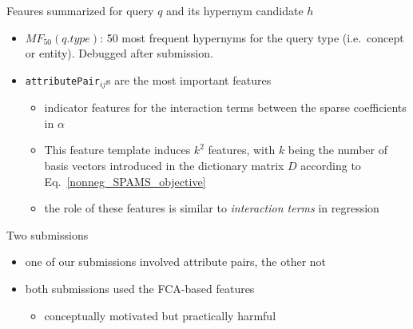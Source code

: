 \documentclass{beamer}
\newlength{\onecolwid}
\newcommand{\bull}[1]{
  \begin{itemize}
    \item #1
  \end{itemize}
}
\begin{document}
\begin{frame}[t]
\begin{columns}[t]
\begin{column}{\onecolwid}
\begin{block}{Feaures summarized}{ for query $q$ and its hypernym candidate $h$ }

\begin{itemize}
  \item $MF_{50}(q.type)$: 50 most frequent hypernyms for the query type
    (i.e.~concept or entity). Debugged after submission.


  \item \texttt{attributePair}$_{ij}$s are the most important features
    \begin{itemize}
      \item indicator features for the interaction terms between the sparse
        coefficients in $\alpha$
      \item This feature template induces $k^2$ features, with $k$ being the
        number of basis vectors introduced in the dictionary matrix $D$
        according to Eq.~\ref{nonneg_SPAMS_objective}
      \item the role of these features is similar to \emph{interaction terms}
        in regression
    \end{itemize}
\end{itemize}
\end{block}

  \bigskip
  \begin{block}{Two submissions}
    \begin{itemize}
      \item one of our submissions involved attribute pairs, the other not
      \item both submissions used the FCA-based features
        \bull{conceptually motivated but practically harmful}
    \end{itemize}


\end{block}
\end{column}
\end{columns}
\end{frame}
\end{document}
